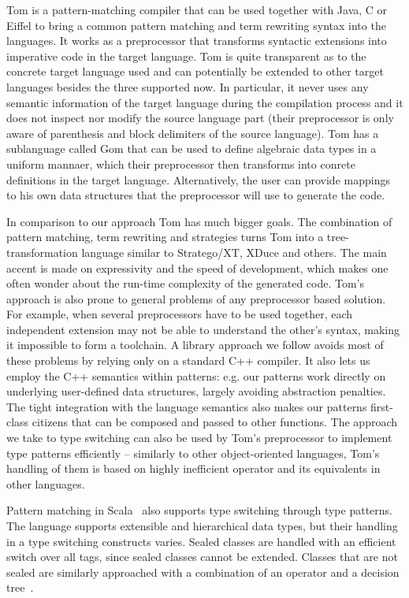 Tom is a pattern-matching compiler that can be used together with Java, C or 
Eiffel to bring a common pattern matching and term rewriting syntax into the 
languages\cite{Moreau:2003}. It works as a preprocessor that transforms 
syntactic extensions into imperative code in the target language. Tom is quite 
transparent as to the concrete target language used and can potentially be 
extended to other target languages besides the three supported now. In 
particular, it never uses any semantic information of the target language during 
the compilation process and it does not inspect nor modify the source language 
part (their preprocessor is only aware of parenthesis and block delimiters of 
the source language). Tom has a sublanguage called Gom that can be used to 
define algebraic data types in a uniform mannaer, which their preprocessor then 
transforms into conrete definitions in the target language. Alternatively, the 
user can provide mappings to his own data structures that the preprocessor will 
use to generate the code.

In comparison to our approach Tom has much bigger goals. The combination of 
pattern matching, term rewriting and strategies turns Tom into a 
tree-transformation language similar to Stratego/XT, XDuce and others. 
The main accent is made on expressivity and the speed of development, which 
makes one often wonder about the run-time complexity of the generated code.
Tom's approach is also prone to general problems of any preprocessor based 
solution\cite[]{SELL}. For example, when several preprocessors 
have to be used together, each independent extension may not be able to 
understand the other's syntax, making it impossible to form a toolchain.
A library approach we follow avoids most of these problems by relying only on a 
standard C++ compiler. It also lets us employ the C++ semantics within 
patterns: e.g. our patterns work directly on underlying user-defined data 
structures, largely avoiding abstraction penalties. The tight integration with 
the language semantics also makes our patterns first-class citizens that can be 
composed and passed to other functions. The approach we take to type switching 
can also be used by Tom's preprocessor to implement type patterns efficiently -- 
similarly to other object-oriented languages, Tom's handling of them is based on 
highly inefficient  operator and its equivalents in other 
languages.

Pattern matching in Scala~\cite{Scala2nd} also supports type switching through 
type patterns. The language supports extensible and hierarchical data types, but 
their handling in a type switching constructs varies. Sealed classes are handled 
with an efficient switch over all tags, since sealed classes cannot be extended. 
Classes that are not sealed are similarly approached with a combination of an 
 operator and a decision tree~\cite{EmirThesis}.

